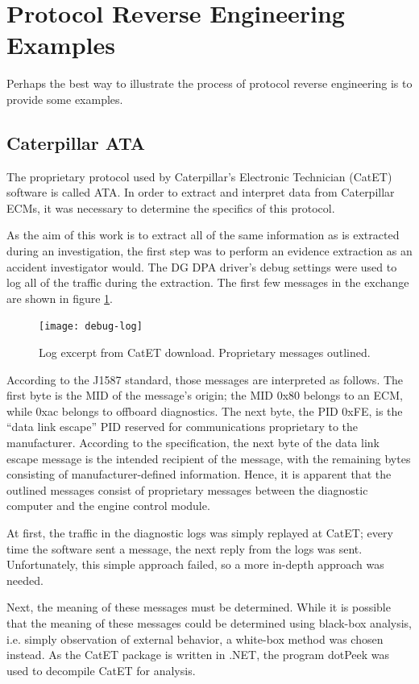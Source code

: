 \documentclass{report}
\begin{document}
\section{Protocol Reverse Engineering Examples}

Perhaps the best way to illustrate the process of protocol reverse engineering is to provide some examples.

\subsection{Caterpillar ATA}

The proprietary protocol used by Caterpillar's Electronic Technician (CatET) software is called ATA. In order to extract and interpret data from
Caterpillar ECMs, it was necessary to determine the specifics of this protocol.

As the aim of this work is to extract all of the same information as is extracted during an investigation, the first step was to perform
an evidence extraction as an accident investigator would. The DG DPA driver's debug settings were used to log all of the traffic during the
extraction. The first few messages in the exchange are shown in figure \ref{fig:dglog}.

\begin{figure}[h]
  \centering
  \texttt{[image: debug-log]}
  \caption{Log excerpt from CatET download. Proprietary messages outlined.}
  \label{fig:dglog}
\end{figure}

According to the J1587\cite{J1587} standard, those messages are interpreted as follows. The first byte is the MID of the message's origin; the MID
0x80 belongs to an ECM, while 0xac belongs to offboard diagnostics. The next byte, the PID 0xFE, is the ``data link escape'' PID reserved for communications
proprietary to the manufacturer. According to the specification, the next byte of the data link escape message is the intended recipient of the message,
with the remaining bytes consisting of manufacturer-defined information. Hence, it is apparent that the outlined messages consist of proprietary messages
between the diagnostic computer and the engine control module.

At first, the traffic in the diagnostic logs was simply replayed at CatET; every time the software sent a message, the next reply from the logs was sent.
Unfortunately, this simple approach failed, so a more in-depth approach was needed.

Next, the meaning of these messages must be determined. While it is possible that the meaning of these messages could be determined using black-box analysis,
i.e. simply observation of external behavior, a white-box method was chosen instead. As the CatET package is written in .NET, the program dotPeek was used
to decompile CatET for analysis.
\end{document}
